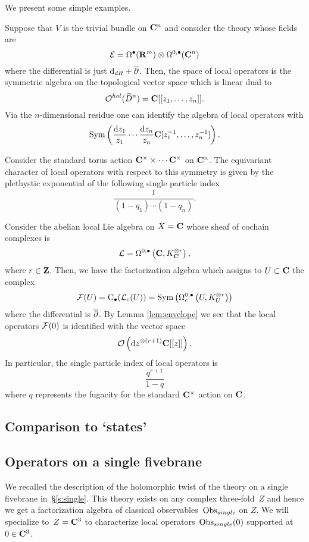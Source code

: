 \parsec[s:examples]

We present some simple examples. 

\begin{eg}
Suppose that $V$ is the trivial bundle on $\mathbf{C}^n$ and consider the theory whose fields are
\[
\mathcal E = \Omega^\bullet(\mathbf{R}^m) \otimes \Omega^{0,\bullet}(\mathbf{C}^n) 
\]
where the differential is just ${\rm d}_{dR} + \overline{\partial}$. 
Then, the space of local operators is the symmetric algebra on the topological vector space which is linear dual to 
\[
\mathcal O^{hol}(\widehat{D}^n) = \mathbf{C}[[z_1,\ldots,z_n]] .
\]
Via the $n$-dimensional residue one can identify the algebra of local operators with 
\[
\operatorname{Sym}\left(\frac{{\rm d} z_1}{z_1} \cdots \frac{{\rm d} z_n}{z_n}  \mathbf{C}[z_1^{-1}, \ldots , z_n^{-1}]\right) .
\]

Consider the standard torus action $\mathbf{C}^\times \times \cdots \mathbf{C}^\times$ on $\mathbf{C}^n$. 
The equivariant character of local operators with respect to this symmetry is given by the plethystic exponential of the following single particle index
\[
\frac{1}{(1-q_1)\cdots (1-q_n)} .
\]
\end{eg}

\begin{eg}
Consider the abelian local Lie algebra on $X = \mathbf{C}$ whose sheaf of cochain complexes is 
\[
\mathcal L = \Omega^{0,\bullet}\left(\mathbf{C}, K_{\mathbf{C}}^{\otimes r}\right),
\]
where $r \in \mathbf{Z}$. 
Then, we have the factorization algebra which assigns to $U \subset \mathbf{C}$ the complex
\[
\mathcal F(U) = {\rm C}_\bullet(\mathcal L_c(U)) = \operatorname{Sym}\left(\Omega^{0,\bullet}_c\left(U, K_U^{\otimes r}\right)\right)
\]
where the differential is $\overline{\partial}$. 
By Lemma \ref{lem:envelope} we see that the local operators $\mathcal F(0)$ is identified with the vector space
\[
\mathcal O\left({\rm d} z^{\otimes (r + 1)} \mathbf{C}[[z]] \right) .
\]
In particular, the single particle index of local operators is 
\[
\frac{q^{r+1}}{1-q} 
\]
where $q$ represents the fugacity for the standard $\mathbf{C}^\times$ action on $\mathbf{C}$.
\end{eg}


\subsection{Comparison to `states'}

\subsection{Operators on a single fivebrane}

We recalled the description of the holomorphic twist of the theory on a single fivebrane in~\S\ref{s:single}. 
This theory exists on any complex three-fold~$Z$ and hence we get a factorization algebra of classical observables~$\operatorname{Obs}_{single}$ on $Z$.
We will specialize to~$Z=\mathbf{C}^3$ to characterize local operators~$\operatorname{Obs}_{single}(0)$ supported at~$0 \in \mathbf{C}^3$. 


